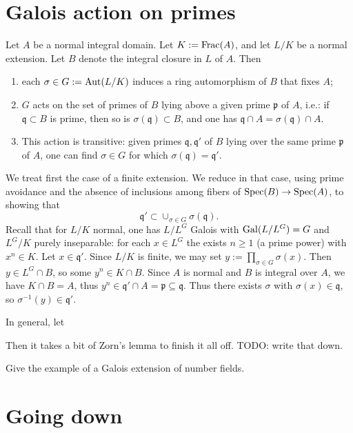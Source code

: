 \documentclass[reqno]{amsart}
\begin{document}
\section{Galois action on primes}
\label{sec:org5aca683}

\begin{lemma}
  Let $A$ be a normal integral domain.  Let $K := \operatorname{Frac}(A)$, and
  let $L/K$ be a normal extension.  Let $B$ denote the integral
  closure in $L$ of $A$.  Then
  \begin{enumerate}
  \item each $\sigma \in G := \operatorname{Aut}(L/K)$ induces a ring
    automorphism of $B$ that fixes $A$;
  \item $G$ acts on the set of primes of $B$ lying above a given
    prime $\mathfrak{p}$ of $A$, i.e.: if
    $\mathfrak{q} \subset B$ is prime, then so is
    $\sigma(\mathfrak{q}) \subset B$, and one has
    $\mathfrak{q} \cap A = \sigma(\mathfrak{q}) \cap A$.
  \item This action is transitive: given primes
    $\mathfrak{q}, \mathfrak{q} '$ of $B$ lying over the same
    prime $\mathfrak{p}$ of $A$, one can find $\sigma \in G$ for
    which $\sigma(\mathfrak{q}) = \mathfrak{q} '$.
  \end{enumerate}
\end{lemma}
We treat first the case of a finite extension.
We reduce in that case, using prime avoidance and the absence of inclusions
among fibers of \(\operatorname{Spec}(B) \rightarrow \operatorname{Spec}(A)\),
to showing that
\[
    \mathfrak{q} ' \subset \cup_{\sigma \in
      G} \sigma(\mathfrak{q}).
  \]
Recall that for \(L/K\)
normal, one has \(L/L^G\) Galois with \(\operatorname{Gal}(L/L^G) = G\) and
\(L^G/K\) purely inseparable: for each \(x \in L^G\) the exists
\(n \geq 1\) (a prime power) with \(x^n \in K\).
Let \(x \in \mathfrak{q} '\).
Since \(L/K\) is finite,
we may set \(y := \prod_{\sigma \in G}
  \sigma(x)\).
Then \(y \in L^G \cap B\), so some \(y^n \in K \cap B\).
Since \(A\) is normal and \(B\) is integral over \(A\), we have \(K
  \cap B = A\),
thus \(y^n \in \mathfrak{q} ' \cap A = \mathfrak{p} \subseteq \mathfrak{q}\).
Thus there exists \(\sigma\) with \(\sigma(x) \in \mathfrak{q}\),
so \(\sigma^{-1}(y) \in \mathfrak{q} '\).

In general,
let 

Then it takes a bit of Zorn's lemma to finish it all off.
TODO: write that down.

Give the example of a Galois extension of number fields.


\section{Going down}
\label{sec:org4bb7b6b}
\end{document}
